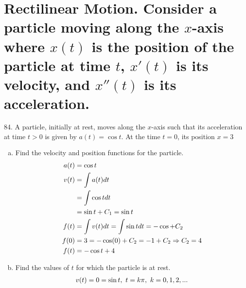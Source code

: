 \documentclass[11pt]{article}
\newcommand*{\set}{\setcounter{equation}{0}}
\begin{document}
\section{Rectilinear Motion. Consider a particle
moving along the $x$-axis where $x(t)$ is the position of the particle
at time $t$, $x'(t)$ is its velocity, and $x''(t)$ is its acceleration.}
84. A particle, initially at rest, moves along the $x$-axis such that its acceleration at time $t>0$ is given by $a(t)=\cos t$. At the time $t=0$, its position $x=3$
\begin{enumerate}[(a)]
    \item Find the velocity and position functions for the particle.
        \begin{align}
            \set
            a(t)&=\cos t\\
            v(t)&=\int a(t)dt\\
            &=\int\cos tdt\\
            &=\sin t+C_1=\sin t\\
            f(t)&=\int v(t)dt=\int\sin tdt=-\cos +C_2\\
            f(0)&=3=-\cos(0)+C_2=-1+C_2\Rightarrow C_2=4\\
            f(t)&=-\cos t+4
        \end{align}
    \item Find the values of $t$ for which the particle is at rest.
        \begin{align}
            \set
            v(t)=0=\sin t,\,\, t=k\pi,\,\, k=0, 1, 2,...
        \end{align}
\end{enumerate}
\end{document}
